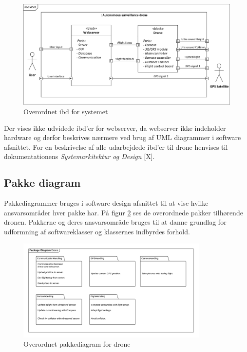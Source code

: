 \begin{figure}[H]
	\centering
	\includegraphics[width=1\textwidth]{Billeder/Projektbeskrivelse/ibd1_overordnet.pdf}
	\caption{Overordnet ibd for systemet}
	\label{fig:ibd_asd}
\end{figure}

Der vises ikke udvidede ibd'er for webserver, da webserver ikke indeholder hardware og derfor beskrives nærmere ved brug af UML diagrammer i software afsnittet. For en beskrivelse af alle udarbejdede ibd'er til drone henvises til dokumentationens \textit{Systemarkitektur og Design} [X].

\subsection{Pakke diagram}
\vspace{-0.3cm}	
Pakkediagrammer bruges i software design afsnittet til at vise hvilke ansvarsområder hver pakke har. På figur \ref{fig:package_drone} ses de overordnede pakker tilhørende dronen. Pakkerne og deres ansvarsområde bruges til at danne grundlag for udformning af softwareklasser og klassernes indbyrdes forhold.
 
\begin{figure}[H]
	\centering
	\includegraphics[width=0.85\textwidth]{Billeder/Projektbeskrivelse/Packagediagram_drone}
	\vspace{-0.3cm}	
	\caption{Overordnet pakkediagram for drone}
	\label{fig:package_drone}
\end{figure}